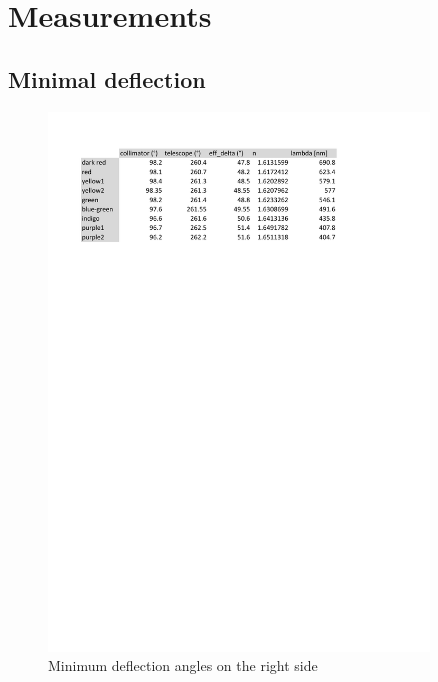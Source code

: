 \documentclass{scrreprt}
\begin{document}
\section{Measurements}

\subsection{Minimal deflection}
\begin{figure}[H]
	\centering
  \includegraphics[width=0.9\textwidth]{diag/right.pdf}
	\caption{Minimum deflection angles on the right side}
	\label{fig:right}
\end{figure}
\end{document}
